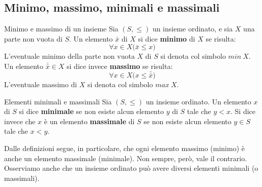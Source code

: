 \subsection{Minimo, massimo, minimali e massimali}
\begin{defbox}{Minimo e massimo di un insieme}
	Sia $(S,\leq)$ un insieme ordinato, e sia $X$ una parte non vuota di $S$. Un elemento $\bar{x}$ di $X$ si dice \textbf{minimo} di $X$ se risulta:
	\begin{displaymath}
		\forall x \in X \bigl( \bar{x} \leq x \bigr)
	\end{displaymath}
	L'eventuale minimo della parte non vuota $X$ di $S$ si denota col simbolo $min \ X$. Un elemento $\bar{\bar{x}} \in X$ si dice invece \textbf{massimo} se risulta:
	\begin{displaymath}
		\forall x \in X \bigl(x \leq \bar{\bar{x}}\bigr)
	\end{displaymath}
	L'eventuale massimo di $X$ si denota col simbolo $max \ X$.
	
\end{defbox}

\begin{defbox}{Elementi minimali e massimali}
	Sia $(S,\leq)$ un insieme ordinato. Un elemento $x$ di $S$ si dice \textbf{minimale} se non esiste alcun elemento $y$ di $S$ tale che $y < x$. Si dice invece che $x$ è un elemento \textbf{massimale} di $S$ se non esiste alcun elemento $y \in S$ tale che $x < y$.
\end{defbox}

Dalle definizioni segue, in particolare, che ogni elemento massimo (minimo) è anche un elemento massimale (minimale).  Non sempre, però, vale il contrario. Osserviamo anche che un insieme ordinato può avere diversi elementi minimali (o massimali). 

